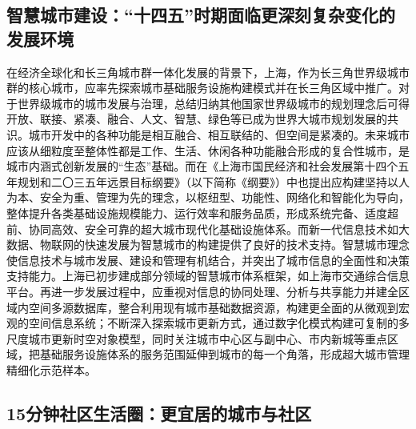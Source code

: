 \documentclass{shnuthesis}
\begin{document}
\subsection{智慧城市建设：“十四五”时期面临更深刻复杂变化的发展环境}

在经济全球化和长三角城市群一体化发展的背景下，上海，作为长三角世界级城市群的核心城市，应率先探索城市基础服务设施构建模式并在长三角区域中推广。对于世界级城市的城市发展与治理，总结归纳其他国家世界级城市的规划理念后可得开放、联接、紧凑、融合、人文、智慧、绿色等已成为世界大城市规划发展的共识。城市开发中的各种功能是相互融合、相互联结的、但空间是紧凑的。未来城市应该从细粒度至整体性都是工作、生活、休闲各种功能融合形成的复合性城市，是城市内涵式创新发展的“生态”基础。而在《上海市国民经济和社会发展第十四个五年规划和二〇三五年远景目标纲要》（以下简称《纲要》）中也提出应构建坚持以人为本、安全为重、管理为先的理念，以枢纽型、功能性、网络化和智能化为导向，整体提升各类基础设施规模能力、运行效率和服务品质，形成系统完备、适度超前、协同高效、安全可靠的超大城市现代化基础设施体系\textsuperscript{\cite{shanghaishirenminzhengfu}}。而新一代信息技术如大数据、物联网的快速发展为智慧城市的构建提供了良好的技术支持\textsuperscript{\cite{jian2011}}。智慧城市理念使信息技术与城市发展、建设和管理有机结合，并突出了城市信息的全面性和决策支持能力\textsuperscript{\cite{wang2019a}}。上海已初步建成部分领域的智慧城市体系框架，如上海市交通综合信息平台。再进一步发展过程中，应重视对信息的协同处理、分析与共享能力并建全区域内空间多源数据库，整合利用现有城市基础数据资源，构建更全面的从微观到宏观的空间信息系统；不断深入探索城市更新方式，通过数字化模式构建可复制的多尺度城市更新时空对象模型，同时关注城市中心区与副中心、市内新城等重点区域，把基础服务设施体系的服务范围延伸到城市的每一个角落，形成超大城市管理精细化示范样本。

\subsection{15分钟社区生活圈：更宜居的城市与社区}
\end{document}
